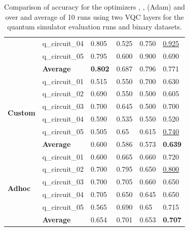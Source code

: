 \begin{table}[!h]
{\begin{tabular}{p{}p{}|p{}p{}p{}p{}}
    		                        & q\_circuit\_04 & 0.805  & 0.525 & 0.750   & \underline{0.925} \\
    		                        & q\_circuit\_05 & 0.795  & 0.600 & 0.900   & 0.690 \\
    		\cline{2-6} 
    		                        & \textbf{Average}      & \textbf{0.802}  & 0.687 & 0.796   & 0.771 \\
    		\hline
    		\multirow{6}{*}{\textbf{Custom}} & q\_circuit\_01 & 0.515  & 0.550 & 0.700   & 0.630 \\
    		                        & q\_circuit\_02 & 0.690  & 0.550 & 0.500   & 0.605 \\
    		                        & q\_circuit\_03 & 0.700  & 0.645 & 0.500   & 0.700 \\
    		                        & q\_circuit\_04 & 0.590  & 0.535 & 0.550  & 0.520 \\
    		                        & q\_circuit\_05 & 0.505  & 0.65 & 0.615   & \underline{0.740} \\
    		\cline{2-6} 
    		                        & \textbf{Average}      & 0.600 & 0.586 & 0.573   & \textbf{0.639} \\
    		\hline 
    		\multirow{6}{*}{\textbf{Adhoc}}  & q\_circuit\_01 & 0.600  & 0.665 & 0.660   & 0.720 \\
    		                        & q\_circuit\_02 & 0.700  & 0.795 & 0.650   & \underline{0.800} \\
    		                        & q\_circuit\_03 & 0.700  & 0.705 & 0.660   & 0.650 \\
    		                        & q\_circuit\_04 & 0.705 & 0.650 & 0.645   & 0.650 \\
    		                        & q\_circuit\_05 & 0.565 & 0.690 & 0.65   & 0.715 \\
    		\cline{2-6} 
    		                        & \textbf{Average} & 0.654  & 0.701 & 0.653  & \textbf{0.707} \\
    		\hline 
    	\end{tabular}
	}
	\caption{Comparison of accuracy for the optimizers , ,  (Adam) and  over and average of 10 runs using two VQC layers for the quantum simulator evaluation runs and binary datasets.}
	\label{table:accuracy_comparison_binary_dataset_and_optimizers_simulator_runs}
\end{table}

\clearpage

